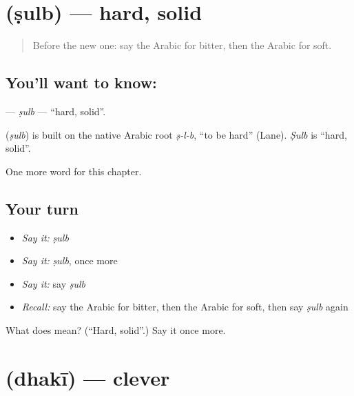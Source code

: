 \section[\texorpdfstring{\ar{صلب} (ṣulb)}{صلب (ṣulb)}]{ (ṣulb) — hard, solid}

\label{lesson:AR-C152-sulb}



\begin{quote}
Before the new one: say the Arabic for bitter, then the Arabic for soft.
\end{quote}

\subsection*{You'll want to know: }
\textbf{} — \emph{ṣulb} — \textquotedblleft{}hard, solid\textquotedblright{}.

\begin{cousinweb}
\textbf{} (\emph{ṣulb}) is built on the native Arabic root \emph{ṣ-l-b}, \textquotedblleft{}to be hard\textquotedblright{} (Lane). \emph{Ṣulb} is \textquotedblleft{}hard, solid\textquotedblright{}.
\end{cousinweb}

\begin{grammarlens}[title={What you've built}]
One more word for this chapter.
\end{grammarlens}

\subsection*{Your turn}
\begin{itemize}
\raggedright
  \item \emph{Say it:} \emph{ṣulb}
  \item \emph{Say it:} \emph{ṣulb}, once more
  \item \emph{Say it:} say \emph{ṣulb}
  \item \emph{Recall:} say the Arabic for bitter, then the Arabic for soft, then say \emph{ṣulb} again
\end{itemize}

\begin{tcolorbox}[breakable,colback=teal!4,colframe=teal!35!black,title={Before you move on}]
What does  mean? (\textquotedblleft{}Hard, solid\textquotedblright{}.) Say it once more.
\end{tcolorbox}
\section[\texorpdfstring{\ar{ذكي} (dhakī)}{ذكي (dhakī)}]{ (dhakī) — clever}

